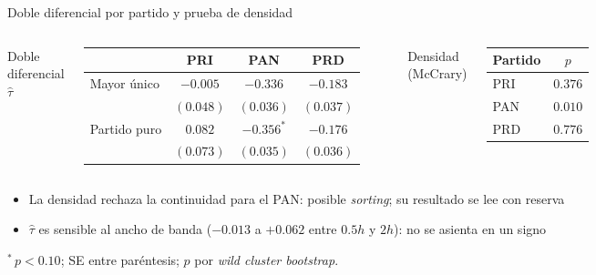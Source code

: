 \documentclass[
  aspectratio=43,        %
  t,                     %
  10pt                   %
]{beamer}
\begin{document}
\begin{frame}{Doble diferencial por partido y prueba de densidad}

  \begin{columns}[T]
    {\small Doble diferencial $\hat{\tau}$}
    \begin{table}\centering\footnotesize
      \begin{tabular}{lccc}
        \toprule
         & PRI & PAN & PRD \\
        \midrule
        Mayor único  & $-0.005$ & $-0.336$ & $-0.183$ \\
                     & $(0.048)$ & $(0.036)$ & $(0.037)$ \\
        Partido puro & $0.082$ & $-0.356^{*}$ & $-0.176$ \\
                     & $(0.073)$ & $(0.035)$ & $(0.036)$ \\
        \bottomrule
      \end{tabular}
    \end{table}

    {\small Densidad (McCrary)}
    \begin{table}\centering\footnotesize
      \begin{tabular}{lc}
        \toprule
        Partido & $p$ \\
        \midrule
        PRI & $0.376$ \\
        PAN & \textcolor{ITAMmaroon}{$0.010$} \\
        PRD & $0.776$ \\
        \bottomrule
      \end{tabular}
    \end{table}
  \end{columns}

  \vspace{0.4em}
  \begin{itemize}
    \item La densidad \textcolor{ITAMmaroon}{rechaza} la continuidad para el PAN:
          posible \emph{sorting}; su resultado se lee con reserva
    \item $\hat{\tau}$ es sensible al ancho de banda ($-0.013$ a $+0.062$ entre
          $0.5h$ y $2h$): no se asienta en un signo
  \end{itemize}

  \vspace{0.2em}
  {\footnotesize \textcolor{ITAMgray}{$^{*}\,p<0.10$; SE entre paréntesis;
    $p$ por \emph{wild cluster bootstrap}.}}

\end{frame}
\end{document}

